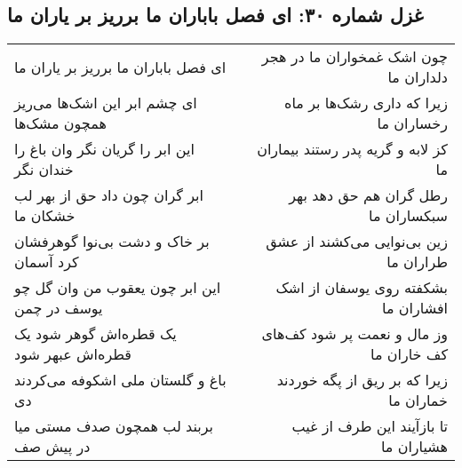 \begin{center}
\section*{غزل شماره ۳۰: ای فصل باباران ما برریز بر یاران ما}
\label{sec:0030}
\begin{longtable}{l p{0.5cm} r}
ای فصل باباران ما برریز بر یاران ما
&&
چون اشک غمخواران ما در هجر دلداران ما
\\
ای چشم ابر این اشک‌ها می‌ریز همچون مشک‌ها
&&
زیرا که داری رشک‌ها بر ماه رخساران ما
\\
این ابر را گریان نگر وان باغ را خندان نگر
&&
کز لابه و گریه پدر رستند بیماران ما
\\
ابر گران چون داد حق از بهر لب خشکان ما
&&
رطل گران هم حق دهد بهر سبکساران ما
\\
بر خاک و دشت بی‌نوا گوهرفشان کرد آسمان
&&
زین بی‌نوایی می‌کشند از عشق طراران ما
\\
این ابر چون یعقوب من وان گل چو یوسف در چمن
&&
بشکفته روی یوسفان از اشک افشاران ما
\\
یک قطره‌اش گوهر شود یک قطره‌اش عبهر شود
&&
وز مال و نعمت پر شود کف‌های کف خاران ما
\\
باغ و گلستان ملی اشکوفه می‌کردند دی
&&
زیرا که بر ریق از پگه خوردند خماران ما
\\
بربند لب همچون صدف مستی میا در پیش صف
&&
تا بازآیند این طرف از غیب هشیاران ما
\\
\end{longtable}
\end{center}
